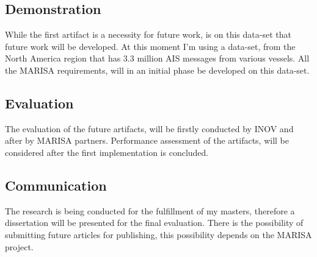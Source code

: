 \subsection{Demonstration}
While the first artifact is a necessity for future work, is on this data-set that future work will be developed. At this moment I'm using a data-set, from the North America region that has 3.3 million AIS messages from various vessels.
All the MARISA requirements, will in an initial phase be developed on this data-set.
\subsection{Evaluation}
The evaluation of the future artifacts, will be firstly conducted by INOV and after by MARISA partners.
Performance assessment of the artifacts, will be considered after the first implementation is concluded.

\subsection{Communication} 
The research is being conducted for the fulfillment of my masters, therefore a dissertation will be presented for the final evaluation. There is the possibility of submitting future articles for publishing, this possibility depends on the MARISA project.
